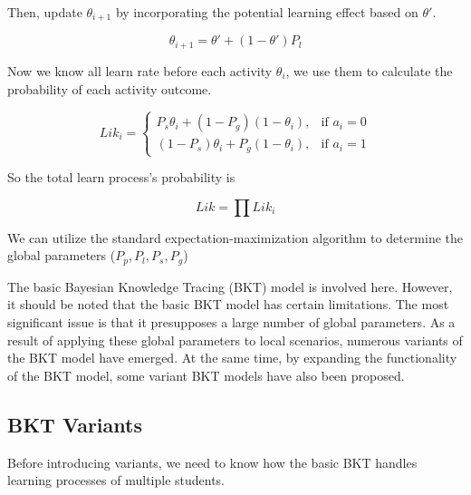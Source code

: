 \documentclass{article}
\begin{document}
Then, update \(\theta_{i+1}\) by incorporating the potential learning effect based on \(\theta'\).

\[
\theta_{i+1} = \theta' + (1 - \theta') P_l    
\]

Now we know all learn rate before each activity \(\theta_i\), we use them to calculate the probability of each activity outcome.

\[
    Lik_i = 
    \begin{cases} 
        P_s \theta_{i} + (1 - P_g) (1 - \theta_i), & \text{if } a_i = 0 \\[10pt]
        (1 - P_s) \theta_{i} + P_g (1 - \theta_i), & \text{if } a_i = 1 
    \end{cases}
\]

So the total learn process's probability is

\[
    Lik = \prod Lik_i
\]

We can utilize the standard expectation-maximization algorithm to determine the global parameters (\(P_p, P_l, P_s, P_g\))

The basic Bayesian Knowledge Tracing (BKT) model is involved here. However, it should be noted that the basic BKT model has certain limitations. The most significant issue is that it presupposes a large number of global parameters. As a result of applying these global parameters to local scenarios, numerous variants of the BKT model have emerged. At the same time, by expanding the functionality of the BKT model, some variant BKT models have also been proposed.

\subsection{BKT Variants}

Before introducing variants, we need to know how the basic BKT handles learning processes of multiple students.
\end{document}
